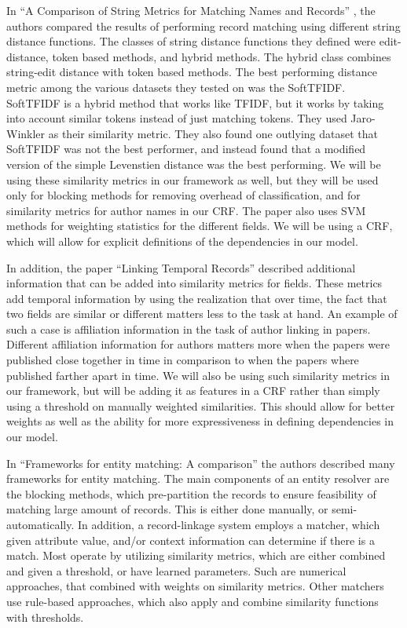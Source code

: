\documentclass[]{article}
\begin{document}
In ``A Comparison of String Metrics for Matching Names and Records'' \cite{cohen2003comparison}, the authors compared the results of performing record matching using different string distance functions. The classes of string distance functions they defined were edit-distance, token based methods, and hybrid methods. The hybrid class combines string-edit distance with token based methods. The best performing distance metric among the various datasets they tested on was the SoftTFIDF. SoftTFIDF is a hybrid method that works like TFIDF, but it works by taking into account similar tokens instead of just matching tokens. They used Jaro-Winkler as their similarity metric. They also found one outlying dataset that SoftTFIDF was not the best performer, and instead found that a modified version of the simple Levenstien distance was the best performing. We will be using these similarity metrics in our framework as well, but they will be used only for blocking methods for removing overhead of classification, and for similarity metrics for author names in our CRF. The paper also uses SVM methods for weighting statistics for the different fields. We will be using a CRF, which will allow for explicit definitions of the dependencies in our model.

In addition, the paper ``Linking Temporal Records'' \cite{DBLP:journals/fcsc/LiDMS12} described additional information that can be added into similarity metrics for fields. These metrics add temporal information by using the realization that over time, the fact that two fields are similar or different matters less to the task at hand. An example of such a case is affiliation information in the task of author linking in papers. Different affiliation information for authors matters more when the papers were published close together in time in comparison to when the papers where published farther apart in time. We will also be using such similarity metrics in our framework, but will be adding it as features in a CRF rather than simply using a threshold on manually weighted similarities. This should allow for better weights as well as the ability for more expressiveness in defining dependencies in our model.

In ``Frameworks for entity matching: A comparison'' \cite{kopcke2010frameworks} the authors described many frameworks for entity matching. The main components of an entity resolver are the blocking methods, which pre-partition the records to ensure feasibility of matching large amount of records. This is either done manually, or semi-automatically. In addition, a record-linkage system employs a matcher, which given attribute value, and/or context information can determine if there is a match. Most operate by utilizing similarity metrics, which are either combined and given a threshold, or have learned parameters. Such are numerical approaches, that combined with weights on similarity metrics. Other matchers use rule-based approaches, which also apply and combine similarity functions with thresholds.
\end{document}
